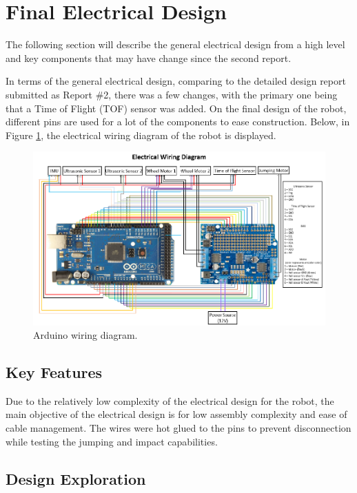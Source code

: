 \documentclass[ece]{uw-wkrpt}
\let\oldsection\section
\renewcommand\section{\clearpage\oldsection}
\begin{document}
\section{Final Electrical Design} \label{electrical}

The following section will describe the general electrical design from a high level and key components that may have change since the second report. 

In terms of the general electrical design, comparing to the detailed design report submitted as Report \#2, there was a few changes, with the primary one being that a Time of Flight (TOF) sensor was added. On the final design of the robot, different pins are used for a lot of the components to ease construction. Below, in Figure \ref{fig:wiring}, the electrical wiring diagram of the robot is displayed. 

\begin{figure}
    \centering
    \includegraphics[width=5.5in]{res/wiringDiagram}
    \caption[Arduino wiring diagram]
          {Arduino wiring diagram.}
    \label{fig:wiring}
\end{figure}

\subsection{Key Features}

Due to the relatively low complexity of the electrical design for the robot, the main objective of the electrical design is for low assembly complexity and ease of cable management. The wires were hot glued to the pins to prevent disconnection while testing the jumping and impact capabilities.

\subsection{Design Exploration} 
\end{document}
